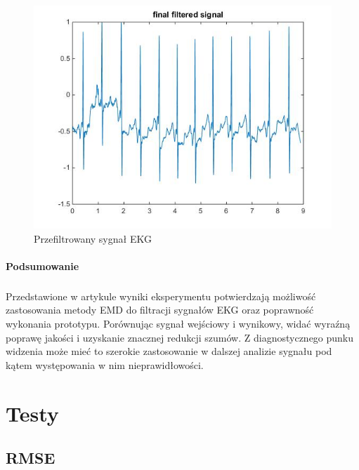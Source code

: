 \documentclass[a4paper]{article}
\begin{document}
\begin{figure}[H]
\centering
\includegraphics[scale=0.7]{emd/filtredECG_IIR}
\caption{\label{emd/filtredECG_IIR} Przefiltrowany sygnał EKG}
\end{figure}

\paragraph{Podsumowanie}
\subparagraph{}

Przedstawione w artykule wyniki eksperymentu potwierdzają możliwość zastosowania  metody EMD do filtracji sygnałów EKG oraz poprawność wykonania prototypu. Porównując sygnał wejściowy i wynikowy, widać wyraźną poprawę jakości i uzyskanie znacznej redukcji szumów. Z diagnostycznego punku widzenia może mieć to szerokie zastosowanie w dalszej analizie sygnału pod kątem występowania w nim nieprawidłowości.




\section{Testy}
\label{sec/tests}


\subsection{RMSE}
\end{document}
